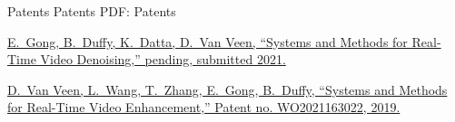 \Section
{Patents}
{Patents}
{PDF: Patents}

\NumberedItem{[2]}
\href{}
{E.~Gong, B.~Duffy, K.~Datta, \underline{D.~Van Veen}, ``Systems and Methods for Real-Time Video Denoising,'' pending, submitted 2021.}

\Gap
\NumberedItem{[1]}
\href{https://patentscope.wipo.int/search/en/detail.jsf?docId=WO2021163022&tab=PCTBIBLIO}
{\underline{D.~Van Veen}, L.~Wang, T.~Zhang, E.~Gong, B.~Duffy, ``Systems and Methods for Real-Time Video Enhancement,'' Patent no. WO2021163022, 2019.}



